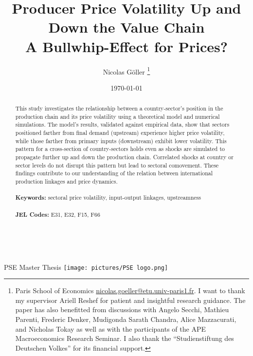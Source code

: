 \documentclass[12pt]{article}
\begin{document}
\begin{titlepage}
\title{Producer Price Volatility Up and Down the Value Chain\\[1ex]
  \large A Bullwhip-Effect for Prices?} 
\begin{center}
\large PSE Master Thesis
\vfill
   \texttt{[image: pictures/PSE logo.png]}
\vfill   
\end{center}
\author{Nicolas Göller \thanks{Paris School of Economics \href{mailto:nicolas.goeller@etu.univ-paris1.fr}
{nicolas.goeller@etu.univ-paris1.fr}. I want to thank my supervisor Ariell Reshef for patient and insightful
 research guidance. The paper has also benefitted from discussions with Angelo Secchi, Mathieu Parenti, Frederic Denker, Mudigonda Sarath Chandra, Alice Mazzacurati, and Nicholas Tokay as well as with the participants of the APE Macroeconomics Research Seminar.
 I also thank the ``Studienstiftung des Deutschen Volkes'' for its financial support.}}
\date{\today}
\maketitle
\begin{abstract}
\noindent This study investigates the relationship between a country-sector's position in the production chain and its price volatility using a theoretical model and numerical simulations. The model's results, validated against empirical data, show that sectors positioned farther from final demand (upstream) experience higher price volatility, while those farther from primary inputs (downstream) exhibit lower volatility. This pattern for a cross-section of country-sectors holds even as shocks are simulated to propagate further up and down the production chain. Correlated shocks at country or sector levels do not disrupt this pattern but lead to sectoral comovement. These findings contribute to our understanding of the relation between international production linkages and price dynamics.
\\
\vspace{0in}\\
\noindent\textbf{Keywords:} sectoral price volatility, input-output linkages, upstreamness\\
\vspace{0in}\\
\noindent\textbf{JEL Codes:} E31, E32, F15, F66\\
\vspace{1.7in}\\
\\

\bigskip
\end{abstract}
\thispagestyle{empty}
\end{titlepage}
\end{document}
